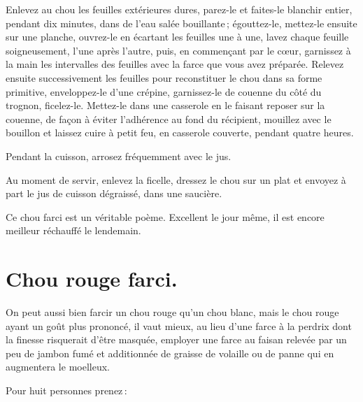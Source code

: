 Enlevez au chou les feuilles extérieures dures, parez-le et faites-le blanchir
entier, pendant dix minutes, dans de l'eau salée bouillante ; égouttez-le,
mettez-le ensuite sur une planche, ouvrez-le en écartant les feuilles une
à une, lavez chaque feuille soigneusement, l’une après l'autre, puis, en
commençant par le cœur, garnissez à la main les intervalles des feuilles avec
la farce que vous avez préparée. Relevez ensuite successivement les feuilles
pour reconstituer le chou dans sa forme primitive, enveloppez-le d'une crépine,
garnissez-le de couenne du côté du trognon, ficelez-le. Mettez-le dans une
casserole en le faisant reposer sur la couenne, de façon à éviter l’adhérence
au fond du récipient, mouillez avec le bouillon et laissez cuire à petit feu,
en casserole couverte, pendant quatre heures.

Pendant la cuisson, arrosez fréquemment avec le jus.

Au moment de servir, enlevez la ficelle, dressez le chou sur un plat et envoyez
à part le jus de cuisson dégraissé, dans une saucière.

Ce chou farci est un véritable poème. Excellent le jour même, il est encore
meilleur réchauffé le lendemain.

\section*{\centering Chou rouge farci.}
{}

On peut aussi bien farcir un chou rouge qu'un chou blanc, mais le chou rouge
ayant un goût plus prononcé, il vaut mieux, au lieu d'une farce à la perdrix dont
la finesse risquerait d'être masquée, employer une farce au faisan relevée par un
peu de jambon fumé et additionnée de graisse de volaille ou de panne qui en
augmentera le moelleux.

\medskip

Pour huit personnes prenez :

